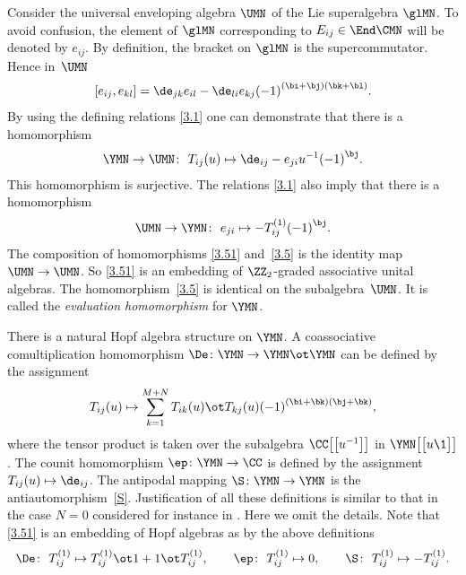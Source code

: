 Consider the universal enveloping
algebra $\UMN$ of the Lie superalgebra $\glMN $.
To avoid confusion, the element of $\glMN$
corresponding to $E_{ij}\in\End\CMN$ will be denoted by $e_{ij} $.
By definition, the bracket on $\glMN$ is the supercommutator.
Hence in~$\UMN$
\begin{gather}\label{glMN}
[ e_{ij} ,e_{kl} ]=
\de_{jk} e_{il}-
\de_{li} e_{kj}
{(-1)}^{( \bi+ \bj )( \bk+ \bl )} .
\end{gather}
By using the defining relations \eqref{3.1} one can demonstrate that
there is a homomorphism
\begin{gather}\label{3.5}
\YMN\to\UMN\colon \ T_{ij}(u)\mapsto \de_{ij}-e_{ji} u^{-1} {(-1)}^{\bj} .
\end{gather}
This homomorphism is surjective. The relations \eqref{3.1} also imply that there is a homomorphism
\begin{gather}\label{3.51}
\UMN\to\YMN\colon \
e_{ji}\mapsto- T_{ij}^{(1)} {(-1)}^{\bj} .
\end{gather}
The composition of homomorphisms \eqref{3.51}
and~\eqref{3.5}
is the identity map $\UMN\to\UMN $. So
\eqref{3.51} is an embedding of $\ZZ_2$-graded associative unital algebras.
The homomorphism~\eqref{3.5} is identical on the subalgebra~$\UMN $.
It is called
the {\it evaluation homomorphism} for $\YMN $.

There is a natural Hopf algebra structure on $\YMN $.
A coassociative comultiplication homomorphism $\De\colon \YMN\to\YMN\ot\YMN$
can be defined by the assignment
\begin{gather}\label{3.7}
T_{ij}(u)\mapsto\sum_{k=1}^{M+N}
T_{ik}(u)\ot T_{kj}(u)
{(-1)}^{( \bi + \bk )( \bj + \bk )},
\end{gather}
where the tensor product is taken over the subalgebra $\CC\big[\big[u^{-1}\big]\big]$
in $\YMN \big[\big[u\1\big]\big] $.
The counit homomorphism $\ep\colon \YMN\to\CC$ is defined
by the assignment $T_{ij}(u)\mapsto\de_{ij} $.
The antipodal mapping $\S\colon \YMN\to\YMN$ is the antiautomorphism~\eqref{S}.
Justification of all these
definitions is similar to that in the case $N=0$
considered for instance in \cite[Section~1]{MNO}. Here we omit the details.
Note that \eqref{3.51} is an embedding of Hopf algebras as
by the above definitions
\begin{gather*}
\De\colon \ T_{ij}^{(1)}\mapsto T_{ij}^{(1)}\ot1+1\ot T_{ij}^{(1)} ,
\qquad
\ep\colon \ T_{ij}^{(1)}\mapsto0 ,
\qquad
\S\colon \ T_{ij}^{(1)}\mapsto- T_{ij}^{(1)} .
\end{gather*}

